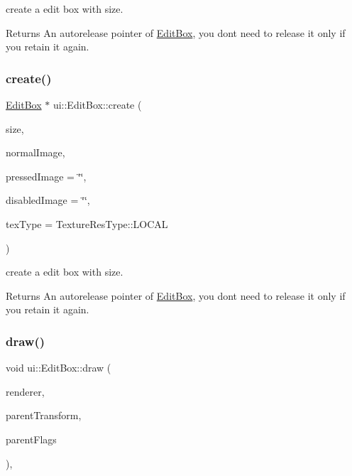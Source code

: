 create a edit box with size. \begin{DoxyReturn}{Returns}
An autorelease pointer of \hyperlink{classui_1_1EditBox}{Edit\+Box}, you don\textquotesingle{}t need to release it only if you retain it again. 
\end{DoxyReturn}
\mbox{\label{classui_1_1EditBox_a50dfa83de5b1ae5834142714d7863cef}} 
\subsubsection{\texorpdfstring{create()}{create()}\hspace{0.1cm}{\footnotesize\ttfamily [5/5]}}
{\footnotesize\ttfamily \hyperlink{classui_1_1EditBox}{Edit\+Box} $\ast$ ui\+::\+Edit\+Box\+::create (\begin{DoxyParamCaption}\item[{const \hyperlink{classSize}{Size} \&}]{size,  }\item[{const std\+::string \&}]{normal\+Image,  }\item[{const std\+::string \&}]{pressed\+Image = {\ttfamily \char`\"{}\char`\"{}},  }\item[{const std\+::string \&}]{disabled\+Image = {\ttfamily \char`\"{}\char`\"{}},  }\item[{\hyperlink{classui_1_1Widget_a040a65ec5ad3b11119b7e16b98bd9af0}{Texture\+Res\+Type}}]{tex\+Type = {\ttfamily TextureResType\+:\+:LOCAL} }\end{DoxyParamCaption})\hspace{0.3cm}{\ttfamily [static]}}

create a edit box with size. \begin{DoxyReturn}{Returns}
An autorelease pointer of \hyperlink{classui_1_1EditBox}{Edit\+Box}, you don\textquotesingle{}t need to release it only if you retain it again. 
\end{DoxyReturn}
\mbox{\label{classui_1_1EditBox_af89050d6cee47d03c205f34fec481db4}} 
\subsubsection{\texorpdfstring{draw()}{draw()}\hspace{0.1cm}{\footnotesize\ttfamily [1/2]}}
{\footnotesize\ttfamily void ui\+::\+Edit\+Box\+::draw (\begin{DoxyParamCaption}\item[{\hyperlink{classRenderer}{Renderer} $\ast$}]{renderer,  }\item[{const \hyperlink{classMat4}{Mat4} \&}]{parent\+Transform,  }\item[{uint32\+\_\+t}]{parent\+Flags }\end{DoxyParamCaption})\hspace{0.3cm}{\ttfamily [override]}, {\ttfamily [virtual]}}

